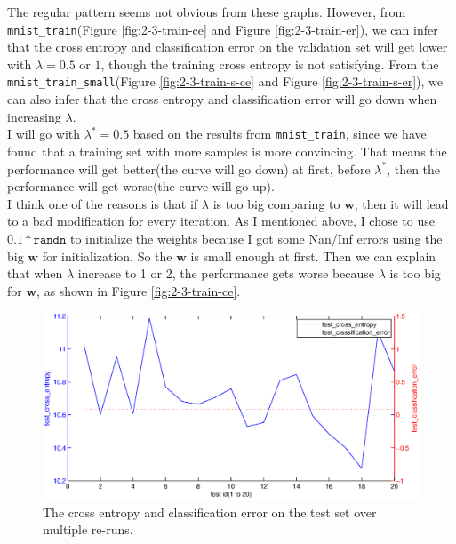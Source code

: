 \documentclass{article}
\begin{document}
The regular pattern seems not obvious from these graphs. However, from \texttt{mnist\_train}(Figure \ref{fig:2-3-train-ce} and Figure \ref{fig:2-3-train-er}), we can infer that the cross entropy and classification error on the validation set will get lower with $\lambda=0.5$ or $1$, though the training cross entropy is not satisfying. From the \texttt{mnist\_train\_small}(Figure \ref{fig:2-3-train-s-ce} and Figure \ref{fig:2-3-train-s-er}), we can also infer that the cross entropy and classification error will go down when increasing $\lambda$.\\

I will go with $\lambda^{*}=0.5$ based on the results from \texttt{mnist\_train}, since we have found that a training set with more samples is more convincing. That means the performance will get better(the curve will go down) at first, before $\lambda^{*}$, then the performance will get worse(the curve will go up).\\

I think one of the reasons is that if $\lambda$ is too big comparing to $\mathbf{w}$, then it will lead to a bad modification for every iteration. As I mentioned above, I chose to use $0.1 * \texttt{randn}$ to initialize the weights because I got some Nan/Inf errors using the big $\mathbf{w}$ for initialization. So the $\mathbf{w}$ is small enough at first. Then we can explain that when $\lambda$ increase to 1 or 2, the performance gets worse because $\lambda$ is too big for $\mathbf{w}$, as shown in Figure \ref{fig:2-3-train-ce}.\\

\begin{figure}[htb]
\centering
\includegraphics[width=\textwidth]{2-3-test.eps}
\caption{The cross entropy and classification error on the test set over multiple re-runs.
\label{fig:2-3-test}}
\end{figure}
\end{document}
